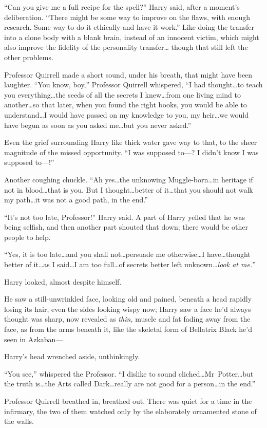 “Can you give me a full recipe for the spell?” Harry said, after a moment’s deliberation. “There might be some way to improve on the flaws, with enough research. Some way to do it ethically and have it work.” Like doing the transfer into a clone body with a blank brain, instead of an innocent victim, which might also improve the fidelity of the personality transfer… though that still left the other problems.

Professor Quirrell made a short sound, under his breath, that might have been laughter. “You know, boy,” Professor Quirrell whispered, “I had thought…to teach you everything…the seeds of all the secrets I knew…from one living mind to another…so that later, when you found the right books, you would be able to understand…I would have passed on my knowledge to you, my heir…we would have begun as soon as you asked me…but you never asked.”

Even the grief surrounding Harry like thick water gave way to that, to the sheer magnitude of the missed opportunity. “I was supposed to—? I didn’t know I was supposed to—!”

Another coughing chuckle. “Ah yes…the unknowing Muggle-born…in heritage if not in blood…that is you. But I thought…better of it…that you should not walk my path…it was not a good path, in the end.”

“It’s not too late, Professor!” Harry said. A part of Harry yelled that he was being selfish, and then another part shouted that down; there would be other people to help.

“Yes, it is too late…and you shall not…persuade me otherwise…I have…thought better of it…as I said…I am too full…of secrets better left unknown…\emph{look at me.}”

Harry looked, almost despite himself.

He saw a still-unwrinkled face, looking old and pained, beneath a head rapidly losing its hair, even the sides looking wispy now; Harry saw a face he’d always thought was sharp, now revealed as \emph{thin,} muscle and fat fading away from the face, as from the arms beneath it, like the skeletal form of Bellatrix Black he’d seen in Azkaban—

Harry’s head wrenched aside, unthinkingly.

“You see,” whispered the Professor. “I dislike to sound cliched…Mr~Potter…but the truth is…the Arts called Dark…really are not good for a person…in the end.”

Professor Quirrell breathed in, breathed out. There was quiet for a time in the infirmary, the two of them watched only by the elaborately ornamented stone of the walls.

